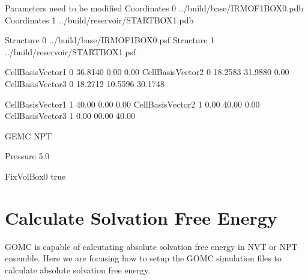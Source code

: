 \documentclass[letterpaper,10pt,english]{sphinxmanual}
\begin{document}
\begin{sphinxVerbatim}[commandchars=\\\{\}]
\PYGZsh{}\PYGZsh{}\PYGZsh{}\PYGZsh{}\PYGZsh{}\PYGZsh{}\PYGZsh{}\PYGZsh{}\PYGZsh{}\PYGZsh{}\PYGZsh{}\PYGZsh{}\PYGZsh{}\PYGZsh{}\PYGZsh{}\PYGZsh{}\PYGZsh{}\PYGZsh{}\PYGZsh{}\PYGZsh{}\PYGZsh{}\PYGZsh{}\PYGZsh{}\PYGZsh{}\PYGZsh{}\PYGZsh{}\PYGZsh{}\PYGZsh{}\PYGZsh{}\PYGZsh{}\PYGZsh{}\PYGZsh{}\PYGZsh{}\PYGZsh{}\PYGZsh{}\PYGZsh{}\PYGZsh{}\PYGZsh{}\PYGZsh{}\PYGZsh{}\PYGZsh{}\PYGZsh{}\PYGZsh{}\PYGZsh{}\PYGZsh{}\PYGZsh{}\PYGZsh{}\PYGZsh{}\PYGZsh{}\PYGZsh{}\PYGZsh{}\PYGZsh{}\PYGZsh{}\PYGZsh{}\PYGZsh{}\PYGZsh{}
\PYGZsh{} Parameters need to be modified
\PYGZsh{}\PYGZsh{}\PYGZsh{}\PYGZsh{}\PYGZsh{}\PYGZsh{}\PYGZsh{}\PYGZsh{}\PYGZsh{}\PYGZsh{}\PYGZsh{}\PYGZsh{}\PYGZsh{}\PYGZsh{}\PYGZsh{}\PYGZsh{}\PYGZsh{}\PYGZsh{}\PYGZsh{}\PYGZsh{}\PYGZsh{}\PYGZsh{}\PYGZsh{}\PYGZsh{}\PYGZsh{}\PYGZsh{}\PYGZsh{}\PYGZsh{}\PYGZsh{}\PYGZsh{}\PYGZsh{}\PYGZsh{}\PYGZsh{}\PYGZsh{}\PYGZsh{}\PYGZsh{}\PYGZsh{}\PYGZsh{}\PYGZsh{}\PYGZsh{}\PYGZsh{}\PYGZsh{}\PYGZsh{}\PYGZsh{}\PYGZsh{}\PYGZsh{}\PYGZsh{}\PYGZsh{}\PYGZsh{}\PYGZsh{}\PYGZsh{}\PYGZsh{}\PYGZsh{}\PYGZsh{}\PYGZsh{}\PYGZsh{}
Coordinates     0   ../build/base/IRMOF\PYGZus{}1\PYGZus{}BOX\PYGZus{}0.pdb
Coordinates     1   ../build/reservoir/START\PYGZus{}BOX\PYGZus{}1.pdb

Structure       0   ../build/base/IRMOF\PYGZus{}1\PYGZus{}BOX\PYGZus{}0.psf
Structure       1   ../build/reservoir/START\PYGZus{}BOX\PYGZus{}1.psf

CellBasisVector1    0   36.8140   0.00     0.00
CellBasisVector2    0   18.2583  31.9880   0.00
CellBasisVector3    0   18.2712  10.5596  30.1748

CellBasisVector1    1   40.00     0.00    0.00
CellBasisVector2    1    0.00    40.00    0.00
CellBasisVector3    1    0.00    00.00   40.00

GEMC        NPT

Pressure    5.0

FixVolBox0  true
\end{sphinxVerbatim}


\section{Calculate Solvation Free Energy}
\label{\detokenize{howto:calculate-solvation-free-energy}}
GOMC is capable of calcutating absolute solvation free energy in NVT or NPT ensemble. Here
we are focusing how to setup the GOMC simulation files to calculate absolute solvation free energy.
\end{document}
